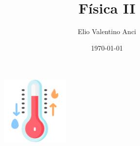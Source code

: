\documentclass[a4paper,12pt]{article}  %
\begin{document}
\title{Física II}
\author{Elio Valentino Anci}
\date{\today}
\maketitle
\begin{figure}[h]
    \centering
    \includegraphics[width=0.3\textwidth]{images/cover.png}
\end{figure}
\newpage

\tableofcontents  %

\newpage









\end{document}
